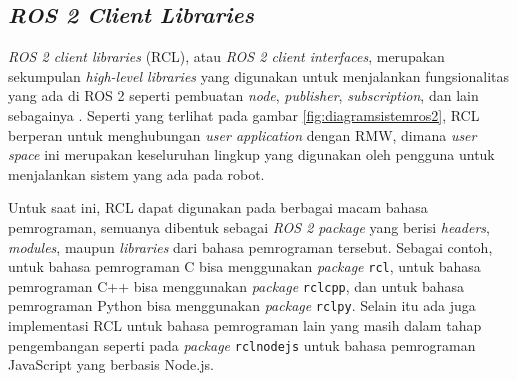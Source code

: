 \subsection{\emph{ROS 2 Client Libraries}}
\label{subsec:rcl}

\emph{ROS 2 client libraries} (RCL), atau \emph{ROS 2 client interfaces},
  merupakan sekumpulan \emph{high-level libraries} yang digunakan untuk menjalankan fungsionalitas yang ada di ROS 2 seperti pembuatan \emph{node}, \emph{publisher}, \emph{subscription}, dan lain sebagainya \citep{url:rclconcept}.
Seperti yang terlihat pada gambar \ref{fig:diagramsistemros2},
  RCL berperan untuk menghubungan \emph{user application} dengan RMW,
  dimana \emph{user space} ini merupakan keseluruhan lingkup yang digunakan oleh pengguna untuk menjalankan sistem yang ada pada robot.

Untuk saat ini, RCL dapat digunakan pada berbagai macam bahasa pemrograman,
  semuanya dibentuk sebagai \emph{ROS 2 package} yang berisi \emph{headers},
  \emph{modules}, maupun \emph{libraries} dari bahasa pemrograman tersebut.
Sebagai contoh, untuk bahasa pemrograman C bisa menggunakan \emph{package} \lstinline{rcl},
  untuk bahasa pemrograman C++ bisa menggunakan \emph{package} \lstinline{rclcpp},
  dan untuk bahasa pemrograman Python bisa menggunakan \emph{package} \lstinline{rclpy}.
Selain itu ada juga implementasi RCL untuk bahasa pemrograman lain yang masih dalam tahap pengembangan seperti pada \emph{package} \lstinline{rclnodejs} \citep{url:rclnodejs} untuk bahasa pemrograman JavaScript yang berbasis Node.js.
